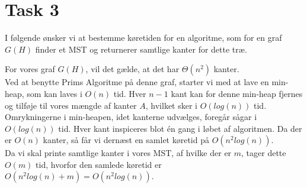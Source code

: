 \section{Task 3}
I følgende ønsker vi at bestemme køretiden for en algoritme, som for en graf $G(H)$ finder et MST og returnerer samtlige kanter for dette træ.
 
For vores graf $G(H)$, vil det gælde, at det har $\Theta(n^2)$ kanter.\\
Ved at benytte Prims Algoritme på denne graf, starter vi med at lave en min-heap, som kan laves i $O(n)$ tid. Hver $n-1$ kant kan for denne min-heap fjernes og tilføje til vores mængde af kanter $A$, hvilket sker i $O(log(n))$ tid. Omrykningerne i min-heapen, idet kanterne udvælges, foregår sågar i $O(log(n))$ tid.
Hver kant inspiceres blot én gang i løbet af algoritmen. Da der er $O(n)$ kanter, så får vi dernæst en samlet køretid på $O(n^2log(n))$.\\
Da vi skal printe samtlige kanter i vores MST, af hvilke der er $m$, tager dette$O(m)$ tid, hvorfor den samlede køretid er $O(n^2log(n) + m) = O(n^2log(n))$. 
